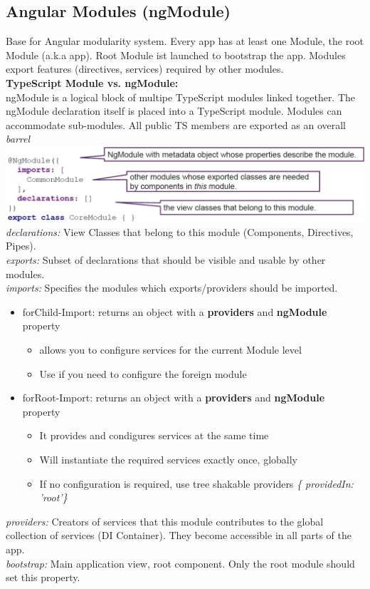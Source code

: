 \subsection{Angular Modules (ngModule)}
Base for Angular modularity system. Every app has at least one Module, the root Module (a.k.a app).
Root Module ist launched to bootstrap the app.
Modules export features (directives, services) required by other modules.\\
\textbf{TypeScript Module vs. ngModule:}\\
ngModule is a logical block of multipe TypeScript modules linked together.
The ngModule declaration itself is placed into a TypeScript module.
Modules can accommodate sub-modules. All public TS members are exported as an overall \textit{barrel}
\includegraphics[width=\linewidth]{img/angular_module_declaration.png}
\textit{declarations:} View Classes that belong to this module (Components, Directives, Pipes).\\
\textit{exports:} Subset of declarations that should be visible and usable by other modules.\\
\textit{imports:} Specifies the modules which exports/providers should be imported.
\begin{itemize}
    \item forChild-Import: returns an object with a \textbf{providers} and \textbf{ngModule} property
    \begin{itemize}
        \item allows you to configure services for the current Module level
        \item Use if you need to configure the foreign module
    \end{itemize}
    \item forRoot-Import:  returns an object with a \textbf{providers} and \textbf{ngModule} property
    \begin{itemize}
        \item It provides and condigures services at the same time
        \item Will instantiate the required services exactly once, globally
        \item If no configuration is required, use tree shakable providers \textit{\{ providedIn: 'root'\}}
    \end{itemize}
\end{itemize}
\textit{providers:} Creators of services that this module contributes to the global collection of services (DI Container).
They become accessible in all parts of the app.\\
\textit{bootstrap:} Main application view, root component.
Only the root module should set this property.

